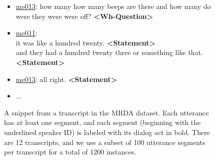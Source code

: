 \begin{figure*}[t]
\begin{tcolorbox}
\begin{itemize}
        \item \underline{me013}: how many how many beeps are there and how many do were they were were off? \textbf{<Wh-Question>}
        \item \underline{me011}:\\
        it was like a hundred twenty. \textbf{<Statement>}\\
        and they had a hundred twenty three or something like that. \textbf{<Statement>}
        \item \underline{me013}: all right. \textbf{<Statement>}
        \item ...
    \end{itemize}

    \end{tcolorbox}
    \caption{A snippet from a transcript in the MRDA dataset. Each utterance has at least one segment, and each segment (beginning with the underlined speaker ID) is labeled with its dialog act in bold. There are 12 transcripts, and we use a subset of 100 utterance segments per transcript for a total of 1200 instances.}
    \label{fig_mrda_example}
\end{figure*}